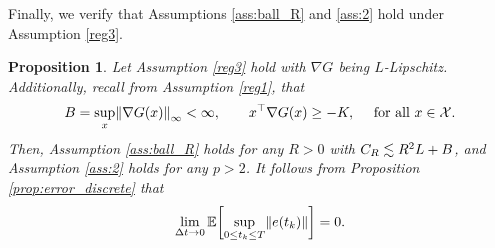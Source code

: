\documentclass[11pt, twoside]{report}
\newtheorem{proposition}[theorem]{Proposition}
\begin{document}
Finally, we verify  that Assumptions \ref{ass:ball_R} and \ref{ass:2} hold under Assumption \ref{reg3}.

\begin{proposition}\label{prop:error_discrete_part2}
Let Assumption \ref{reg3} hold with  $\nabla G$ being $L$-Lipschitz. Additionally, recall from Assumption \ref{reg1}, that $$\cinfty=\sup_{x} \norm{\nabla G(x)}_\infty<\infty,\qquad x^\top \nabla G(x) \ge -\ccc, \quad \text{ for all } x\in \mathcal X.$$ 
Then, Assumption \ref{ass:ball_R} holds for any $R>0$ with $C_R \lesssim R^2 L + B$, and Assumption \ref{ass:2} holds for any $p>2$.
It follows from Proposition \ref{prop:error_discrete} that 
$$
\lim_{\deltat \to 0} \EE\bp{\sup_{0\leq t_k \leq T} \norm{e(t_k)}} = 0.
$$
\end{proposition}
\end{document}
